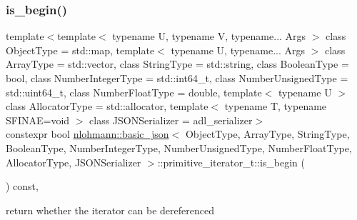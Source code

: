 \subsubsection{\texorpdfstring{is\+\_\+begin()}{is\_begin()}}
{\footnotesize\ttfamily template$<$template$<$ typename U, typename V, typename... Args $>$ class Object\+Type = std\+::map, template$<$ typename U, typename... Args $>$ class Array\+Type = std\+::vector, class String\+Type  = std\+::string, class Boolean\+Type  = bool, class Number\+Integer\+Type  = std\+::int64\+\_\+t, class Number\+Unsigned\+Type  = std\+::uint64\+\_\+t, class Number\+Float\+Type  = double, template$<$ typename U $>$ class Allocator\+Type = std\+::allocator, template$<$ typename T, typename S\+F\+I\+N\+A\+E=void $>$ class J\+S\+O\+N\+Serializer = adl\+\_\+serializer$>$ \\
constexpr bool \hyperlink{classnlohmann_1_1basic__json}{nlohmann\+::basic\+\_\+json}$<$ Object\+Type, Array\+Type, String\+Type, Boolean\+Type, Number\+Integer\+Type, Number\+Unsigned\+Type, Number\+Float\+Type, Allocator\+Type, J\+S\+O\+N\+Serializer $>$\+::primitive\+\_\+iterator\+\_\+t\+::is\+\_\+begin (\begin{DoxyParamCaption}{ }\end{DoxyParamCaption}) const\hspace{0.3cm}{\ttfamily [inline]}, {\ttfamily [noexcept]}}



return whether the iterator can be dereferenced 

\mbox{\label{classnlohmann_1_1basic__json_1_1primitive__iterator__t_acab269d2efcbc29135f77f456ce2c3d2}} 
